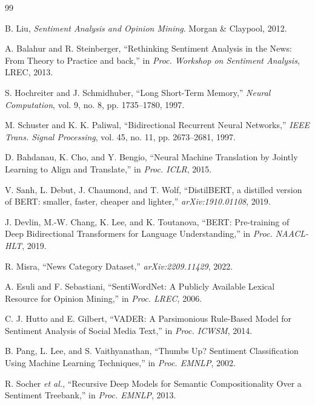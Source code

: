 \documentclass[conference]{IEEEtran}
\begin{document}
\begin{thebibliography}{99}

B. Liu, \textit{Sentiment Analysis and Opinion Mining}.
Morgan \& Claypool, 2012.

A. Balahur and R. Steinberger, ``Rethinking Sentiment Analysis in
the News: From Theory to Practice and back,'' in
\textit{Proc. Workshop on Sentiment Analysis}, LREC, 2013.

S. Hochreiter and J. Schmidhuber, ``Long Short-Term Memory,''
\textit{Neural Computation}, vol. 9, no. 8, pp. 1735--1780, 1997.

M. Schuster and K. K. Paliwal, ``Bidirectional Recurrent Neural
Networks,'' \textit{IEEE Trans. Signal Processing}, vol. 45, no. 11,
pp. 2673--2681, 1997.

D. Bahdanau, K. Cho, and Y. Bengio, ``Neural Machine Translation by
Jointly Learning to Align and Translate,'' in \textit{Proc. ICLR},
2015.

V. Sanh, L. Debut, J. Chaumond, and T. Wolf, ``DistilBERT, a
distilled version of BERT: smaller, faster, cheaper and lighter,''
\textit{arXiv:1910.01108}, 2019.

J. Devlin, M.-W. Chang, K. Lee, and K. Toutanova, ``BERT:
Pre-training of Deep Bidirectional Transformers for Language
Understanding,'' in \textit{Proc. NAACL-HLT}, 2019.

R. Misra, ``News Category Dataset,'' \textit{arXiv:2209.11429}, 2022.

A. Esuli and F. Sebastiani, ``SentiWordNet: A Publicly Available
Lexical Resource for Opinion Mining,'' in \textit{Proc. LREC}, 2006.

C. J. Hutto and E. Gilbert, ``VADER: A Parsimonious Rule-Based Model
for Sentiment Analysis of Social Media Text,'' in
\textit{Proc. ICWSM}, 2014.

B. Pang, L. Lee, and S. Vaithyanathan, ``Thumbs Up? Sentiment
Classification Using Machine Learning Techniques,'' in
\textit{Proc. EMNLP}, 2002.

R. Socher \textit{et al.}, ``Recursive Deep Models for Semantic
Compositionality Over a Sentiment Treebank,'' in
\textit{Proc. EMNLP}, 2013.


\end{thebibliography}
\end{document}
